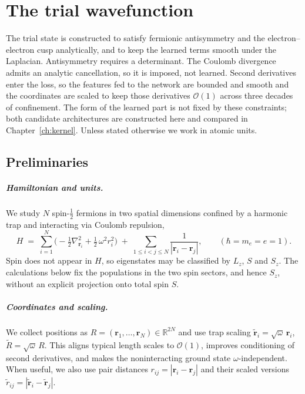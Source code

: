 
\begingroup
\let\clearpage\relax
\let\cleardoublepage\relax
\chapter{The trial wavefunction}
\label{ch:trial_wavefunction}
\endgroup

The trial state is constructed to satisfy fermionic antisymmetry and the electron--electron
cusp analytically, and to keep the learned terms smooth under the Laplacian. Antisymmetry
requires a determinant. The Coulomb divergence admits an analytic cancellation, so it is imposed, not learned. Second derivatives enter the loss, so the features fed to the
network are bounded and smooth and the coordinates are scaled to keep those derivatives
$\mathcal{O}(1)$ across three decades of confinement. The form of the learned part is not
fixed by these constraints; both candidate architectures are constructed here and compared
in Chapter~\ref{ch:kernel}. Unless stated otherwise we work in atomic units.

\section{Preliminaries}
\label{sec:setup}

\paragraph{Hamiltonian and units.}
We study $N$ spin-$\tfrac12$ fermions in two spatial dimensions confined by a harmonic trap
and interacting via Coulomb repulsion,
\begin{equation}
\label{eq:dot-h}
H \;=\; \sum_{i=1}^N \Big( -\tfrac12 \nabla_{\mathbf r_i}^2 + \tfrac12 \,\omega^2 r_i^2 \Big)
\;+\; \sum_{1\le i<j\le N} \frac{1}{|\mathbf r_i-\mathbf r_j|},
\qquad (\hbar=m_e=e=1).
\end{equation}
Spin does not appear in $H$, so eigenstates may be classified by $L_z$, $S$ and $S_z$.
The calculations below fix the populations in the two spin sectors, and hence $S_z$, without
an explicit projection onto total spin $S$.

\paragraph{Coordinates and scaling.}
We collect positions as $R=(\mathbf r_1,\ldots,\mathbf r_N)\in\mathbb R^{2N}$ and use trap scaling
$\tilde{\mathbf r}_i=\sqrt{\omega}\,\mathbf r_i$, $\tilde{R}=\sqrt{\omega}\,R$. This aligns typical
length scales to $\mathcal O(1)$, improves conditioning of second derivatives, and makes the
noninteracting ground state $\omega$-independent. When useful, we also use pair distances
$r_{ij}=|\mathbf r_i-\mathbf r_j|$ and their scaled versions $\tilde r_{ij}=|\tilde{\mathbf r}_i-\tilde{\mathbf r}_j|$.

